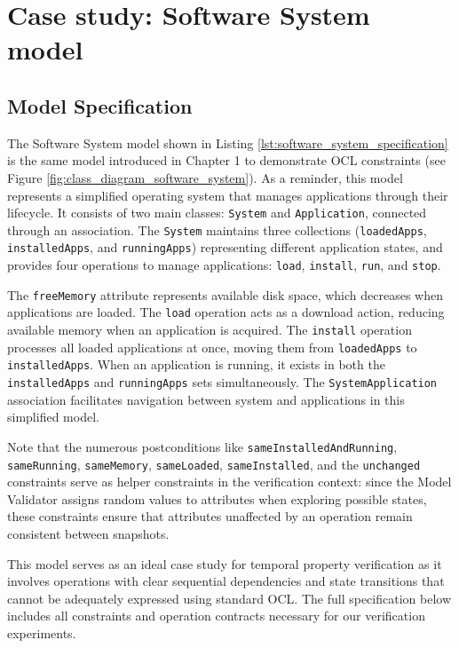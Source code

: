 \section{Case study: Software System model}
\label{sec:case_study_software_system}

\subsection{Model Specification}

The Software System model shown in Listing \ref{lst:software_system_specification} 
is the same model introduced in Chapter 1 to demonstrate OCL constraints (see 
Figure \ref{fig:class_diagram_software_system}). As a reminder, this model represents 
a simplified operating system that manages applications through their lifecycle. 
It consists of two main classes: \texttt{System} and \texttt{Application}, connected 
through an association. The \texttt{System} maintains three collections 
(\texttt{loadedApps}, \texttt{installedApps}, and \texttt{runningApps}) representing 
different application states, and provides four operations to manage applications: 
\texttt{load}, \texttt{install}, \texttt{run}, and \texttt{stop}.

The \texttt{freeMemory} attribute represents available disk space, which decreases 
when applications are loaded. The \texttt{load} operation acts as a download action, 
reducing available memory when an application is acquired. The \texttt{install} 
operation processes all loaded applications at once, moving them from 
\texttt{loadedApps} to \texttt{installedApps}. When an application is running, it 
exists in both the \texttt{installedApps} and \texttt{runningApps} sets simultaneously. 
The \texttt{SystemApplication} association facilitates navigation between system and 
applications in this simplified model.

Note that the numerous postconditions like \texttt{sameInstalledAndRunning}, 
\texttt{sameRunning}, \texttt{sameMemory}, \texttt{sameLoaded}, \texttt{sameInstalled}, 
and the \texttt{unchanged} constraints serve as helper constraints in the verification 
context: since the Model Validator assigns random values to attributes when exploring 
possible states, these constraints ensure that attributes unaffected by an operation 
remain consistent between snapshots.

This model serves as an ideal case study for temporal property verification as it 
involves operations with clear sequential dependencies and state transitions that 
cannot be adequately expressed using standard OCL. The full specification below 
includes all constraints and operation contracts necessary for our verification 
experiments.

